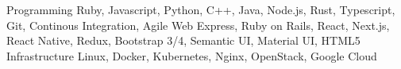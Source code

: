 \begin{cvskills}
  \cvskill
    {Programming}
    {Ruby, Javascript, Python, C++, Java, Node.js, Rust, Typescript, Git, Continous Integration, Agile}
  \cvskill
    {Web}
    {Express, Ruby on Rails, React, Next.js, React Native, Redux, Bootstrap 3/4, Semantic UI, Material UI, HTML5}
  \cvskill
    {Infrastructure}
    {Linux, Docker, Kubernetes, Nginx, OpenStack, Google Cloud}
\end{cvskills}
